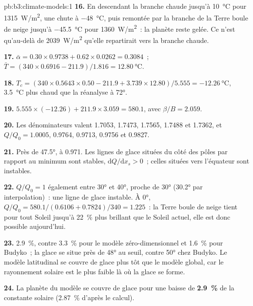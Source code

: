 \begin{solution}{pb:b3:climate-models:1}
\textbf{16.} En descendant la branche chaude jusqu'à \qty{10}{\celsius} pour
\qty{1315}{W/m^2}, une chute à \qty{-48}{\celsius}, puis remontée par la
branche de la Terre boule de neige jusqu'à \qty{-45.5}{\celsius} pour \qty{1360}{W/m^2}~: la planète
reste gelée. Ce n'est qu'au-delà de \qty{2039}{W/m^2} qu'elle repartirait vers la
branche chaude.

\textbf{17.} $\bar\alpha = 0.30\times0.9738 + 0.62\times0.0262 =
\num{0.3084}$~; $\bar T = (340\times0.6916 - 211.9)/1.816 =
\qty{12.80}{\celsius}$.

\textbf{18.} $T_c = (340\times0.5643\times0.50 - 211.9 + 3.739\times12.80)/
5.555 = \qty{-12.26}{\celsius}$, \qty{3.5}{\celsius} plus chaud que la
réanalyse à \ang{72}.

\textbf{19.} $5.555\times(-12.26) + 211.9\times3.059 = \num{580.1}$, avec
$\beta/B = \num{2.059}$.

\textbf{20.} Les dénominateurs valent 1.7053, 1.7473, 1.7565, 1.7488 et
1.7362, et $Q/Q_0 = \num{1.0005}$, \num{0.9764}, \num{0.9713},
\num{0.9756} et \num{0.9827}.

\textbf{21.} Près de \ang{47.5}, à \num{0.971}. Les lignes de glace situées du
côté des pôles par rapport au minimum sont stables, $\mathrm dQ/\mathrm dx_s > 0$~; celles
situées vers l'équateur sont instables.

\textbf{22.} $Q/Q_0 = 1$ également entre \ang{30} et \ang{40}, proche de
\ang{30} (\ang{30.2} par interpolation)~: une ligne de glace instable. À \ang{0},
$Q/Q_0 = 580.1/(0.6106 + 0.7824)/340 = \num{1.225}$~: la Terre boule de neige tient
pour tout Soleil jusqu'à \qty{22}{\percent} plus brillant que le Soleil actuel, elle
est donc possible aujourd'hui.

\textbf{23.} \qty{2.9}{\percent}, contre \qty{3.3}{\percent} pour le
modèle zéro-dimensionnel et \qty{1.6}{\percent} pour Budyko~; la glace se situe
près de \ang{48} au seuil, contre \ang{50} chez Budyko. Le modèle latitudinal
se couvre de glace plus tôt que le modèle global, car le rayonnement solaire est le plus faible là où
la glace se forme.

\textbf{24.} La planète du modèle se couvre de glace pour une baisse de
\textbf{\qty[text-series-to-math=true]{2.9}{\percent}} de la
constante solaire (\qty{2.87}{\percent} d'après le calcul).
\end{solution}
